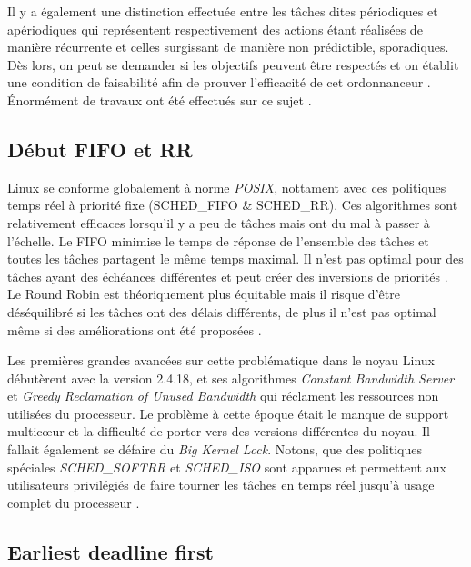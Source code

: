 \documentclass[letterpaper]{article}
\begin{document}
Il y a également une distinction effectuée entre les tâches dites périodiques et apériodiques qui représentent respectivement des actions étant réalisées de manière récurrente et celles surgissant de manière non prédictible, sporadiques. Dès lors, on peut se demander si les objectifs peuvent être respectés et on établit une condition de faisabilité afin de prouver l'efficacité de cet ordonnanceur \citep{128746}. Énormément de travaux ont été effectués sur ce sujet \citep{Sha:2004:RTS:1028913.1028959}.

\subsection{Début FIFO et RR}

Linux se conforme globalement à norme \textit{POSIX}, nottament avec ces politiques temps réel à priorité fixe (SCHED\_FIFO \& SCHED\_RR). Ces algorithmes sont relativement efficaces lorsqu'il y a peu de tâches mais ont du mal à passer à l'échelle. Le FIFO minimise le temps de réponse de l'ensemble des tâches et toutes les tâches partagent le même temps maximal. Il n'est pas optimal pour des tâches ayant des échéances différentes et peut créer des inversions de priorités \citep{Klein:1993:PHR:174003}. Le Round Robin est théoriquement plus équitable mais il risque d'être déséquilibré si les tâches ont des délais différents, de plus il n'est pas optimal même si des améliorations ont été proposées \citep{Shreedhar:1995:EFQ:217391.217453}.

Les premières grandes avancées sur cette problématique dans le noyau Linux débutèrent avec la version 2.4.18, et ses algorithmes \textit{Constant Bandwidth Server} \citep{Abeni:1998:IMA:827270.829047} et \textit{Greedy Reclamation of Unused Bandwidth} \citep{Lipari:2000:GRU:1947412.1947445} qui réclament les ressources non utilisées du processeur. Le problème à cette époque était le manque de support multicœur et la difficulté de porter vers des versions différentes du noyau. Il fallait également se défaire du \textit{Big Kernel Lock}. Notons, que des politiques spéciales \textit{SCHED\_SOFTRR} et \textit{SCHED\_ISO} sont apparues et permettent aux utilisateurs privilégiés de faire tourner les tâches en temps réel jusqu'à usage complet du processeur \citep{scordino2006linux}.

\subsection{Earliest deadline first}
\end{document}
